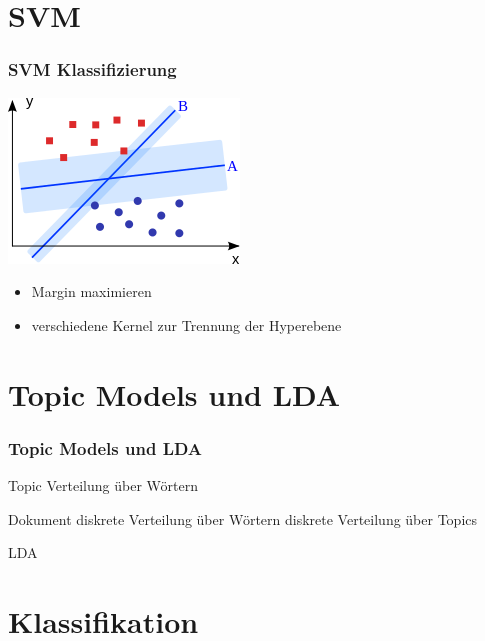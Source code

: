 \documentclass[12pt, xcolor=table]{beamer}
\begin{document}
\section{SVM} %
\label{sec:SVM}

\begin{frame}
    \frametitle{SVM Klassifizierung}
    \begin{center}
    \includegraphics[scale=0.75]{figures/Svm_intro.png}
    \end{center}
    \begin{itemize}
        \item Margin maximieren
        \item verschiedene Kernel zur Trennung der Hyperebene
    \end{itemize}
\end{frame}

\section{Topic Models und LDA} %
\label{sec:LDA}

\begin{frame}
    \frametitle{Topic Models und LDA}
    \begin{block}{Topic}
         Verteilung über Wörtern
    \end{block}
    \begin{block}{Dokument}
        diskrete Verteilung über Wörtern
        diskrete Verteilung über Topics
    \end{block}
    \begin{block}{LDA}
    \end{block}
\end{frame}
\section{Klassifikation} %
\label{sec:Klassifikation}
\end{document}
